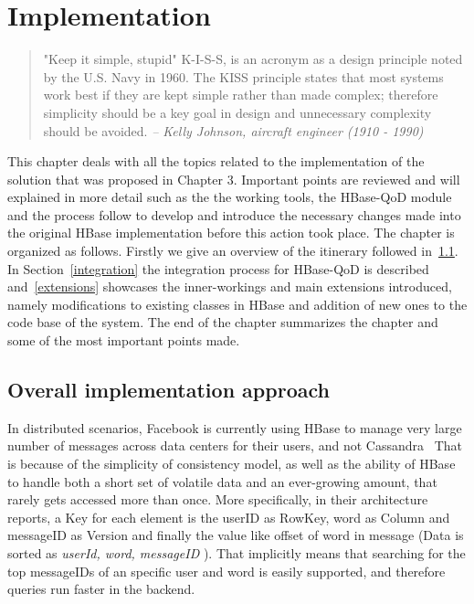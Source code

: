 
\chapter{Implementation}

\label{ch:implemenation}

\begin{quotation}
"Keep it simple, stupid" K-I-S-S, is an acronym as a design principle noted by the U.S. Navy in 1960. The KISS principle states that most systems work best if they are kept simple rather than made complex; therefore simplicity should be a key goal in design and unnecessary complexity should be avoided.
{\small\it -- Kelly Johnson, aircraft engineer (1910 - 1990)}
\end{quotation}


This chapter deals with all the topics related to the implementation of the solution that was proposed in Chapter 3. Important points are reviewed and will explained in more detail such as the the working tools, the HBase-QoD module and the process follow to develop and introduce the necessary changes made into the original HBase implementation before this action took place. The chapter is organized as follows. Firstly we give an overview of the itinerary followed in~\ref{approach}. In Section~\ref{integration} the integration process for HBase-QoD is described and~\ref{extensions} showcases the inner-workings and main extensions introduced, namely modifications to existing classes in HBase and addition of new ones to the code base of the system. The end of the chapter summarizes the chapter and some of the most important points made.

\section{Overall implementation approach}\label{approach}
In distributed scenarios, Facebook is currently using HBase to manage very large number of messages across data centers for their users, and not Cassandra~\cite{FacebookHBase} That is because of the simplicity of consistency model, as well as the ability of HBase to handle both a short set of volatile data and an ever-growing amount, that rarely gets accessed more than once. More specifically, in their architecture reports, a Key for each element is the userID as RowKey, word as Column and messageID as Version and finally the value like offset of word in message (Data is sorted as \emph{userId, word, messageID} ). That implicitly means that searching for the top messageIDs of an specific user and word is easily supported, and therefore queries run faster in the backend.

